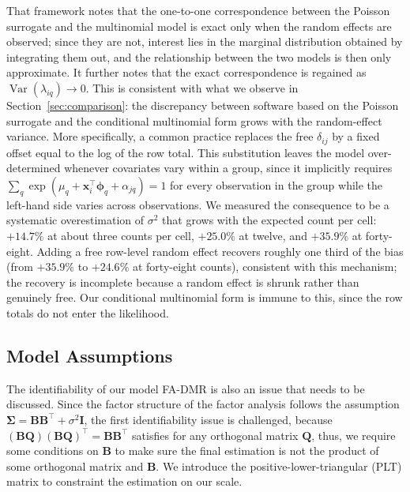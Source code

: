 That framework notes that the one-to-one correspondence between the Poisson surrogate and the multinomial model is exact only when the random effects are observed; since they are not, interest lies in the marginal distribution obtained by integrating them out, and the relationship between the two models is then only approximate. It further notes that the exact correspondence is regained as $\operatorname{Var}(\lambda_{iq})\to0$. This is consistent with what we observe in Section~\ref{sec:comparison}: the discrepancy between software based on the Poisson surrogate and the conditional multinomial form grows with the random-effect variance. More specifically, a common practice replaces the free $\delta_{ij}$ by a fixed offset equal to the log of the row total. This substitution leaves the model over-determined whenever covariates vary within a group, since it implicitly requires $\sum_{q}\exp(\mu_q+\mathbf{x}_i^{\top}\bm{\phi}_q+\alpha_{jq})=1$ for every observation in the group while the left-hand side varies across observations. We measured the consequence to be a systematic overestimation of $\sigma^{2}$ that grows with the expected count per cell: $+14.7\%$ at about three counts per cell, $+25.0\%$ at twelve, and $+35.9\%$ at forty-eight. Adding a free row-level random effect recovers roughly one third of the bias (from $+35.9\%$ to $+24.6\%$ at forty-eight counts), consistent with this mechanism; the recovery is incomplete because a random effect is shrunk rather than genuinely free. Our conditional multinomial form is immune to this, since the row totals do not enter the likelihood.

\subsection{Model Assumptions}
\label{subsec:model-assumptions}

The identifiability of our model FA-DMR is also an issue that needs to be discussed. Since the factor structure of the factor analysis follows the assumption $\bm{\Sigma}=\mathbf{B}\mathbf{B}^{\top}+\sigma^{2}\mathbf{I}$, the first identifiability issue is challenged, because $(\mathbf{BQ})(\mathbf{BQ})^{\top}=\mathbf{B}\mathbf{B}^{\top}$ satisfies for any orthogonal matrix $\mathbf{Q}$, thus, we require some conditions on $\mathbf{B}$ to make sure the final estimation is not the product of some orthogonal matrix and $\mathbf{B}$. We introduce the positive-lower-triangular (PLT) matrix to constraint the estimation on our scale.

